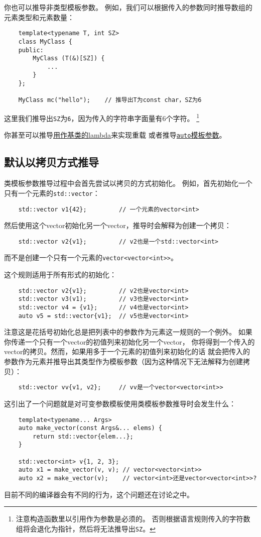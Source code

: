 你也可以推导非类型模板参数。
例如，我们可以根据传入的参数同时推导数组的元素类型和元素数量：
\begin{lstlisting}
    template<typename T, int SZ>
    class MyClass {
    public:
        MyClass (T(&)[SZ]) {
            ...
        }
    };

    MyClass mc("hello");    // 推导出T为const char，SZ为6
\end{lstlisting}
这里我们推导出\texttt{SZ}为\texttt{6}，因为传入的字符串字面量有6个字符。
\footnote{注意构造函数里以引用作为参数是必须的。
否则根据语言规则传入的字符数组将会退化为指针，然后将无法推导出\texttt{SZ}。}

你甚至可以推导\hyperref[ch14.1]{用作基类的lambda}来实现重载
或者推导\hyperref[ch13.1]{\texttt{auto}模板参数}。

\subsection{默认以拷贝方式推导}\label{ch9.1.1}
类模板参数推导过程中会首先尝试以拷贝的方式初始化。
例如，首先初始化一个只有一个元素的\texttt{std::vector}：
\begin{lstlisting}
    std::vector v1{42};         // 一个元素的vector<int>
\end{lstlisting}
然后使用这个vector初始化另一个vector，推导时会解释为创建一个拷贝：
\begin{lstlisting}
    std::vector v2{v1};         // v2也是一个std::vector<int>
\end{lstlisting}
而不是创建一个只有一个元素的\texttt{vector<vector<int>>}。

这个规则适用于所有形式的初始化：
\begin{lstlisting}
    std::vector v2{v1};         // v2也是vector<int>
    std::vector v3(v1);         // v3也是vector<int>
    std::vector v4 = {v1};      // v4也是vector<int>
    auto v5 = std::vector{v1};  // v5也是vector<int>
\end{lstlisting}
注意这是花括号初始化总是把列表中的参数作为元素这一规则的一个例外。
如果你传递一个只有一个vector的初值列来初始化另一个vector，
你将得到一个传入的vector的拷贝。然而，如果用多于一个元素的初值列来初始化的话
就会把传入的参数作为元素并推导出其类型作为模板参数（因为这种情况下无法解释为创建拷贝）：
\begin{lstlisting}
    std::vector vv{v1, v2};     // vv是一个vector<vector<int>>
\end{lstlisting}
这引出了一个问题就是对可变参数模板使用类模板参数推导时会发生什么：
\begin{lstlisting}
    template<typename... Args>
    auto make_vector(const Args&... elems) {
        return std::vector{elem...};
    }

    std::vector<int> v{1, 2, 3};
    auto x1 = make_vector(v, v); // vector<vector<int>>
    auto x2 = make_vector(v);    // vector<int>还是vector<vector<int>>?
\end{lstlisting}
目前不同的编译器会有不同的行为，这个问题还在讨论之中。

